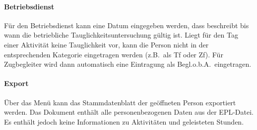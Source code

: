 \paragraph{Betriebsdienst}
Für den Betriebsdienst kann eine Datum eingegeben werden, dass beschreibt bis wann die betriebliche Tauglichkeitsuntersuchung gültig ist.
Liegt für den Tag einer Aktivität keine Tauglichkeit vor, kann die Person nicht in der entsprechenden Kategorie eingetragen werden (z.B.\ als Tf oder Zf).
Für Zugbegleiter wird dann automatisch eine Eintragung als Begl.o.b.A.\ eingetragen.


\paragraph{Export}
Über das Menü  kann das Stammdatenblatt der geöffneten Person exportiert werden.
Das Dokument enthält alle personenbezogenen Daten aus der EPL-Datei.
Es enthält jedoch keine Informationen zu Aktivitäten und geleisteten Stunden.
